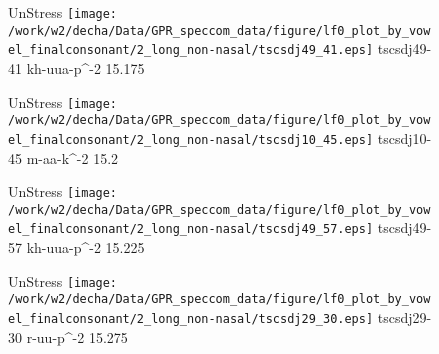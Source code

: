 \documentclass{article}
\begin{document}
\begin{figure}[t]
\begin{minipage}[b]{.24\textwidth}
UnStress
\centering
\texttt{[image: /work/w2/decha/Data/GPR\_speccom\_data/figure/lf0\_plot\_by\_vowel\_finalconsonant/2\_long\_non-nasal/tscsdj49\_41.eps]}
tscsdj49-41 kh-uua-p\textasciicircum-2 15.175
\end{minipage}
\begin{minipage}[b]{.24\textwidth}
UnStress
\centering
\texttt{[image: /work/w2/decha/Data/GPR\_speccom\_data/figure/lf0\_plot\_by\_vowel\_finalconsonant/2\_long\_non-nasal/tscsdj10\_45.eps]}
tscsdj10-45 m-aa-k\textasciicircum-2 15.2
\end{minipage}
\begin{minipage}[b]{.24\textwidth}
UnStress
\centering
\texttt{[image: /work/w2/decha/Data/GPR\_speccom\_data/figure/lf0\_plot\_by\_vowel\_finalconsonant/2\_long\_non-nasal/tscsdj49\_57.eps]}
tscsdj49-57 kh-uua-p\textasciicircum-2 15.225
\end{minipage}
\begin{minipage}[b]{.24\textwidth}
UnStress
\centering
\texttt{[image: /work/w2/decha/Data/GPR\_speccom\_data/figure/lf0\_plot\_by\_vowel\_finalconsonant/2\_long\_non-nasal/tscsdj29\_30.eps]}
tscsdj29-30 r-uu-p\textasciicircum-2 15.275
\end{minipage}
\end{figure}
\end{document}
